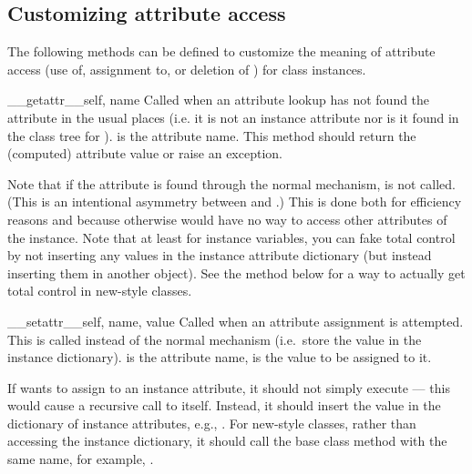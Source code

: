 \subsection{Customizing attribute access\label{attribute-access}}

The following methods can be defined to customize the meaning of
attribute access (use of, assignment to, or deletion of )
for class instances.

\begin{methoddesc}[object]{__getattr__}{self, name}
Called when an attribute lookup has not found the attribute in the
usual places (i.e. it is not an instance attribute nor is it found in
the class tree for ).   is the attribute name.
This method should return the (computed) attribute value or raise an
 exception.

Note that if the attribute is found through the normal mechanism,
 is not called.  (This is an intentional
asymmetry between  and .)
This is done both for efficiency reasons and because otherwise
 would have no way to access other attributes of
the instance.  Note that at least for instance variables, you can fake
total control by not inserting any values in the instance attribute
dictionary (but instead inserting them in another object).  See the
 method below for a way to actually get
total control in new-style classes.
\end{methoddesc}

\begin{methoddesc}[object]{__setattr__}{self, name, value}
Called when an attribute assignment is attempted.  This is called
instead of the normal mechanism (i.e.\ store the value in the instance
dictionary).   is the attribute name,  is the
value to be assigned to it.

If  wants to assign to an instance attribute, it 
should not simply execute  --- this
would cause a recursive call to itself.  Instead, it should insert the
value in the dictionary of instance attributes, e.g.,
.  For new-style classes,
rather than accessing the instance dictionary, it should call the base
class method with the same name, for example,
.
\end{methoddesc}

